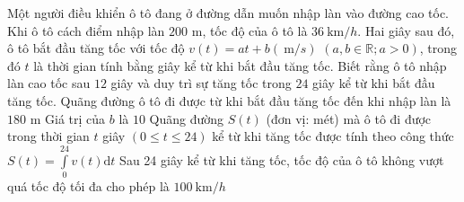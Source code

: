 \begin{ex}%
	Một người điều khiển ô tô đang ở đường dẫn muốn nhập làn vào đường cao tốc. Khi ô tô cách điểm nhập làn $200$ m, tốc độ của ô tô là $36\mathrm{~km} / h$. Hai giây sau đó, ô tô bắt đầu tăng tốc với tốc độ $v(t)=a t+b(\mathrm{~m}/s)$ $(a, b \in \mathbb{R}; a > 0)$, trong đó $t$ là thời gian tính bằng giây kể từ khi bắt đầu tăng tốc. Biết rằng ô tô nhập làn cao tốc sau $12$ giây và duy trì sự tăng tốc trong $24$ giây kể từ khi bắt đầu tăng tốc.
	\choiceTF
	{\True Quãng đường ô tô đi được từ khi bắt đầu tăng tốc đến khi nhập làn là $180$ m}
	{\True Giá trị của $b$ là $10$}
	{Quãng đường $S(t)$ (đơn vị: mét) mà ô tô đi được trong thời gian $t$ giây $(0\leq t \leq 24)$ kể từ khi tăng tốc được tính theo công thức $S(t)=\displaystyle\int\limits_0^{24} v(t) \mathrm{d} t$}
	{Sau 24 giây kể từ khi tăng tốc, tốc độ của ô tô không vượt quá tốc độ tối đa cho phép là $100\mathrm{~km} / h$}
\end{ex}

